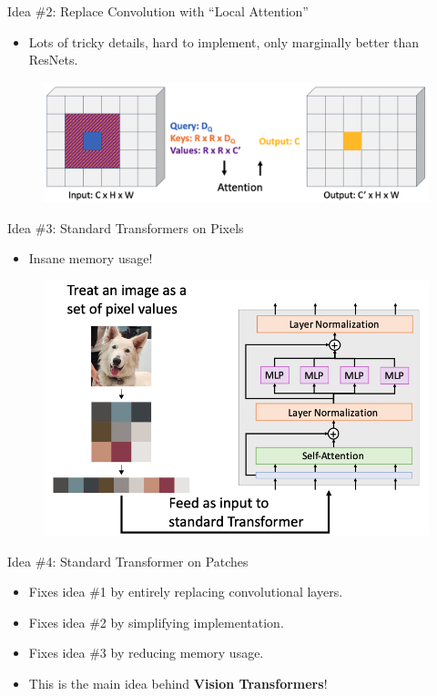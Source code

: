 \begin{frame}{Idea \#2: Replace Convolution with “Local Attention”}
    \begin{itemize}
        \item Lots of tricky details, hard to implement, only marginally better than ResNets.
    \end{itemize}
    \begin{figure}
        \centering
        \includegraphics[width=\linewidth]{pic/idea2}
        \label{fig:idea1}
    \end{figure}
\end{frame}


\begin{frame}{Idea \#3: Standard Transformers on Pixels}
    \begin{itemize}
        \item Insane memory usage!
    \end{itemize}
    \begin{figure}
        \centering
        \includegraphics[width=0.5\linewidth]{pic/idea3}
        \label{fig:idea1}
    \end{figure}
\end{frame}


\begin{frame}{Idea \#4: Standard Transformer on Patches}
    \begin{itemize}
        \item Fixes idea \#1 by entirely replacing convolutional layers.
        \item Fixes idea \#2 by simplifying implementation.
        \item Fixes idea \#3 by reducing memory usage.
        \item This is the main idea behind \textbf{Vision Transformers}!
    \end{itemize}
\end{frame}

